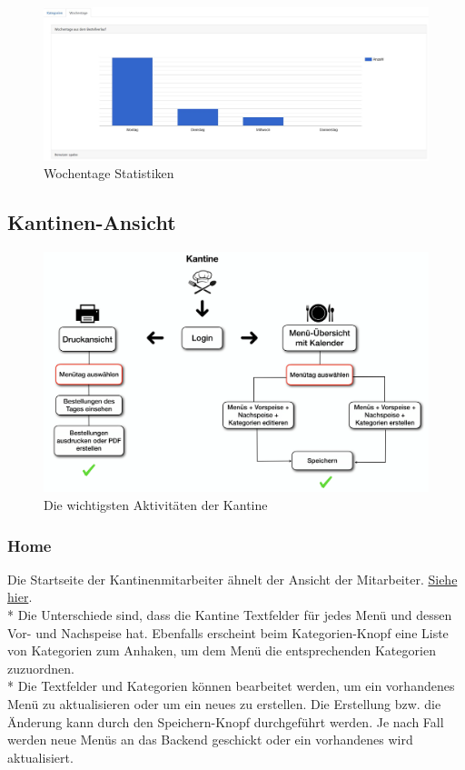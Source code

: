 \begin{figure}[htp]
    \centering
    \includegraphics[scale=0.3]{pics/statistiken_wochentage.JPG}
    \caption{Wochentage Statistiken}
    \label{fig:impl:WeekDaysCategories}
\end{figure}

\pagebreak

\subsection {Kantinen-Ansicht}
\begin{figure}[htp]
    \centering
    \includegraphics[scale=0.125]{pics/activity-kantine.png}
    \caption{Die wichtigsten Aktivitäten der Kantine}
    \label{fig:impl:ActCanteen}
\end{figure}
\subsubsection {Home}

Die Startseite der Kantinenmitarbeiter ähnelt der Ansicht der Mitarbeiter. \hyperref[sec:MitHome]{Siehe hier}. \\*
Die Unterschiede sind, dass die Kantine Textfelder für jedes Menü und dessen Vor- und Nachspeise hat.
Ebenfalls erscheint beim Kategorien-Knopf eine Liste von Kategorien zum Anhaken, um dem Menü die entsprechenden Kategorien zuzuordnen. \\*
Die Textfelder und Kategorien können bearbeitet werden, um ein vorhandenes Menü zu aktualisieren oder um ein neues zu erstellen.
Die Erstellung bzw. die Änderung kann durch den Speichern-Knopf durchgeführt werden. Je nach Fall werden neue Menüs an das Backend geschickt oder ein
vorhandenes wird aktualisiert.

